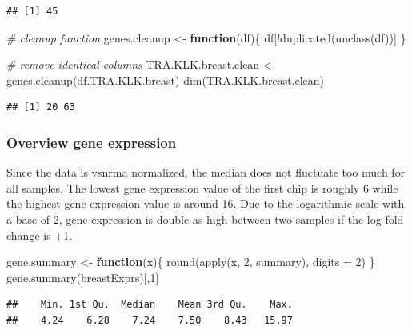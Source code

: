 \documentclass[
]{article}
\newenvironment{Shaded}{\begin{snugshade}}{\end{snugshade}}
\newcommand{\AttributeTok}[1]{\textcolor[rgb]{0.77,0.63,0.00}{#1}}
\newcommand{\CommentTok}[1]{\textcolor[rgb]{0.56,0.35,0.01}{\textit{#1}}}
\newcommand{\ControlFlowTok}[1]{\textcolor[rgb]{0.13,0.29,0.53}{\textbf{#1}}}
\newcommand{\DecValTok}[1]{\textcolor[rgb]{0.00,0.00,0.81}{#1}}
\newcommand{\FunctionTok}[1]{\textcolor[rgb]{0.00,0.00,0.00}{#1}}
\newcommand{\NormalTok}[1]{#1}
\newcommand{\OtherTok}[1]{\textcolor[rgb]{0.56,0.35,0.01}{#1}}
\newcommand{\SpecialCharTok}[1]{\textcolor[rgb]{0.00,0.00,0.00}{#1}}
\begin{document}
\begin{verbatim}
## [1] 45
\end{verbatim}

\begin{Shaded}
\begin{Highlighting}[]
\CommentTok{\# cleanup function }
\NormalTok{genes.cleanup }\OtherTok{\textless{}{-}} \ControlFlowTok{function}\NormalTok{(df)\{}
\NormalTok{  df[}\SpecialCharTok{!}\FunctionTok{duplicated}\NormalTok{(}\FunctionTok{unclass}\NormalTok{(df))]}
\NormalTok{\}}

\CommentTok{\# remove identical columns}
\NormalTok{TRA.KLK.breast.clean }\OtherTok{\textless{}{-}} \FunctionTok{genes.cleanup}\NormalTok{(df.TRA.KLK.breast)}
\FunctionTok{dim}\NormalTok{(TRA.KLK.breast.clean)}
\end{Highlighting}
\end{Shaded}

\begin{verbatim}
## [1] 20 63
\end{verbatim}

\hypertarget{overview-gene-expression}{%
\subsubsection{Overview gene
expression}\label{overview-gene-expression}}

Since the data is vsnrma normalized, the median does not fluctuate too
much for all samples. The lowest gene expression value of the first chip
is roughly 6 while the highest gene expression value is around 16. Due
to the logarithmic scale with a base of 2, gene expression is double as
high between two samples if the log-fold change is +1.

\begin{Shaded}
\begin{Highlighting}[]
\NormalTok{gene.summary }\OtherTok{\textless{}{-}} \ControlFlowTok{function}\NormalTok{(x)\{}
 \FunctionTok{round}\NormalTok{(}\FunctionTok{apply}\NormalTok{(x, }\DecValTok{2}\NormalTok{, summary), }\AttributeTok{digits =} \DecValTok{2}\NormalTok{)}
\NormalTok{\}}
\FunctionTok{gene.summary}\NormalTok{(breastExprs)[,}\DecValTok{1}\NormalTok{]}
\end{Highlighting}
\end{Shaded}

\begin{verbatim}
##    Min. 1st Qu.  Median    Mean 3rd Qu.    Max. 
##    4.24    6.28    7.24    7.50    8.43   15.97
\end{verbatim}
\end{document}
